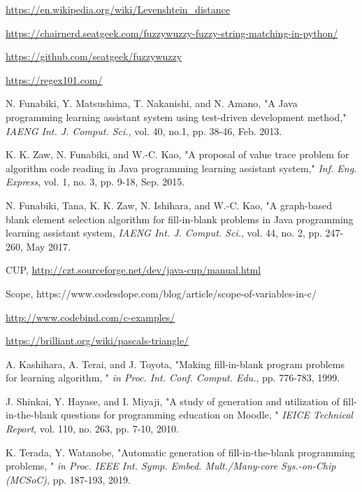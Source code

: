 \documentclass[technicalreport]{ieicej}
\begin{document}
%
%
\begin{thebibliography}{99}%
    \url{https://en.wikipedia.org/wiki/Levenshtein_distance}

    \url{https://chairnerd.seatgeek.com/fuzzywuzzy-fuzzy-string-matching-in-python/}

    \url{https://github.com/seatgeek/fuzzywuzzy}

    \url{https://regex101.com/}


    N. Funabiki, Y. Matsushima, T. Nakanishi, and N. Amano, "A Java programming learning assistant system using test-driven development method," \emph{IAENG Int. J. Comput. Sci.}, vol. 40, no.1, pp. 38-46, Feb. 2013.
    
    K. K. Zaw, N. Funabiki, and W.-C. Kao, "A proposal of value trace problem for algorithm code reading in Java programming learning assistant system," \emph{Inf. Eng. Express}, vol. 1, no. 3, pp. 9-18, Sep. 2015.
    
    N. Funabiki, Tana, K. K. Zaw, N. Ishihara, and W.-C. Kao, "A graph-based blank element selection algorithm for fill-in-blank problems in Java programming learning assistant system, \emph{IAENG Int. J. Comput. Sci.}, vol. 44, no. 2, pp. 247-260, May 2017.
    
    CUP, \url{http://czt.sourceforge.net/dev/java-cup/manual.html}
    
    Scope, https://www.codesdope.com/blog/article/scope-of-variables-in-c/
    
    \url{http://www.codebind.com/c-examples/}
    
    \url{https://brilliant.org/wiki/pascals-triangle/}
    
    A. Kashihara, A. Terai, and J. Toyota, "Making fill-in-blank program problems for learning algorithm, " \emph{in Proc. Int. Conf. Comput. Edu.}, pp. 776-783, 1999.
    
    J. Shinkai, Y. Hayase, and I. Miyaji, "A study of generation and utilization of fill-in-the-blank questions for programming education on Moodle, " \emph{IEICE Technical Report}, vol. 110, no. 263, pp. 7-10, 2010.
    
    K. Terada, Y. Watanobe, "Automatic generation of fill-in-the-blank programming problems, " \emph{in Proc. IEEE Int. Symp. Embed. Mult./Many-core Sys.-on-Chip (MCSoC)}, pp. 187-193, 2019.
\end{thebibliography}
\end{document}
